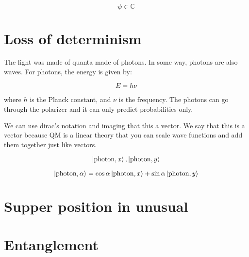 \documentclass[a4paper]{article}
\begin{document}
    \begin{equation*}
        \psi \in  \mathbb{C} 
    \end{equation*}

    \section{Loss of determinism}

    The light was made of quanta made of photons. In some way, photons are also waves. For photons, the energy is given by:

    \begin{equation*}
        E = h \nu
    \end{equation*}
    
    where $h$ is the Planck constant, and $\nu$ is the frequency. The photons can go through the polarizer and it can only predict probabilities only. 

    We can use dirac's notation and imaging that this a vector. We say that this is a vector because QM is a linear theory that you can scale wave functions and add them together just like vectors.
    
    \begin{equation*}
        \ket{\mbox{photon}, x}, \ket{\mbox{photon}, y} 
    \end{equation*}
    

    \begin{equation*}
        \ket{\mbox{photon}, \alpha} = \cos \alpha \ket{\mbox{photon}, x} + \sin \alpha \ket{\mbox{photon}, y} 
    \end{equation*}
   
    
    
    \section{Supper position in unusual}
    \section{Entanglement}
\end{document}

